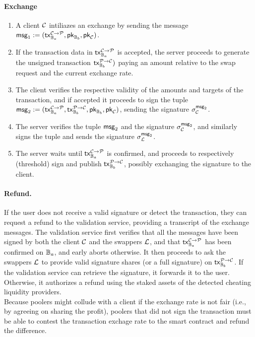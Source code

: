 \paragraph*{Exchange}
\begin{enumerate}
	\item A client $\mathcal{C}$ intiliazes an exchange by sending the message $\mathsf{msg}_1 := (\mathsf{tx}^{\mathcal{C} \rightarrow \mathcal{P}}_{\mathbb{B}_a}, \mathsf{pk}_{\mathbb{B}_b}, \mathsf{pk}_{\mathcal{C}})$.
	\item If the transaction data in $\mathsf{tx}^{\mathcal{C} \rightarrow \mathcal{P}}_{\mathbb{B}_a}$ is accepted, the server proceeds to generate the unsigned transaction $\mathsf{tx}^{\mathcal{P} \rightarrow \mathcal{C}}_{\mathbb{B}_b})$ paying an amount relative to the swap request and the current exchange rate.
	\item The client verifies the respective validity of the amounts and targets of the transaction, and if accepted it proceeds to sign the tuple $\mathsf{msg}_2 := (\mathsf{tx}^{\mathcal{C} \rightarrow \mathcal{P}}_{\mathbb{B}_a}, \mathsf{tx}^{\mathcal{P} \rightarrow \mathcal{C}}_{\mathbb{B}_b}, \mathsf{pk}_{\mathbb{B}_b}, \mathsf{pk}_{\mathcal{C}})$, sending the signature $\sigma^{\mathsf{msg}_2}_{\mathcal{C}}$.
	\item The server verifies the tuple $\mathsf{msg}_2$ and the signature $\sigma^{\mathsf{msg}_2}_{\mathcal{C}}$, and similarly signs the tuple and sends the signature $\sigma^{\mathsf{msg}_2}_{\mathcal{L}}$.
	\item The server waits until $\mathsf{tx}^{\mathcal{C} \rightarrow \mathcal{P}}_{\mathbb{B}_a}$ is confirmed, and proceeds to respectively (threshold) sign and publish $\mathsf{tx}^{\mathcal{P} \rightarrow \mathcal{C}}_{\mathbb{B}_b}$, possibly exchanging the signature to the client.
\end{enumerate}
\paragraph*{Refund.} 
If the user does not receive a valid signature or detect the transaction, they can request a refund to the validation service, providing a transcript of the exchange messages. The validation service first verifies that all the messages have been signed by both the client $\mathcal{C}$ and the swappers $\mathcal{L}$, and that $\mathsf{tx}^{\mathcal{C} \rightarrow \mathcal{P}}_{\mathbb{B}_a}$ has been confirmed on $\mathbb{B}_a$, and early aborts otherwise. It then proceeds to ask the swappers $\mathcal{L}$ to provide valid signature shares (or a full signature) on $\mathsf{tx}^{\mathcal{P} \rightarrow \mathcal{C}}_{\mathbb{B}_b}$. If the validation service can retrieve the signature, it forwards it to the user. Otherwise, it authorizes a refund using the staked assets of the detected cheating liquidity providers. \\
Because poolers might collude with a client if the exchange rate is not fair (i.e., by agreeing on sharing the profit), poolers that did not sign the transaction must be able to contest the transaction exchage rate to the smart contract and refund the difference.
